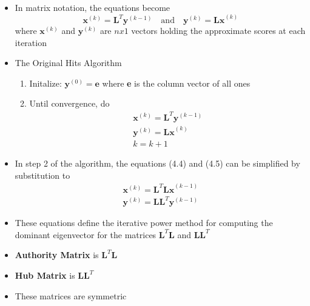 \documentclass[11pt]{report}
\begin{document}
\begin{itemize}
\begin{itemize}
\item In matrix notation, the equations become \begin{equation}
\textbf{x}^{(k)} = \textbf{L}^T\textbf{y}^{(k-1)}\quad\mathrm{and}\quad \textbf{y}^{(k)}=\textbf{Lx}^{(k)}
\end{equation} where \(\textbf{x}^{(k)}\) and \(\textbf{y}^{(k)}\) are \(\textit{n}x1\) vectors holding the approximate scores at each iteration
\item The Original Hits Algorithm
\begin{enumerate}
\item Initalize: \(\textbf{y}^{(0)}=\textbf{e} \) where \textbf{e} is the column vector of all ones
\item Until convergence, do \begin{eqnarray}
\textbf{x}^{(k)} =\textbf{L}^T\textbf{y}^{(k-1)}\\
\textbf{y}^{(k)} =\textbf{Lx}^{(k)}\\
k=k+1
\end{eqnarray}
\end{enumerate}
\item In step 2 of the algorithm, the equations (4.4) and (4.5) can be simplified by substitution to \begin{eqnarray}
\textbf{x}^{(k)} = \textbf{L}^T\textbf{Lx}^{(k-1)}\\ \textbf{y}^{(k)}=\textbf{LL}^T\textbf{y}^{(k-1)}
\end{eqnarray}
\item These equations define the iterative power method for computing the dominant eigenvector for the matrices $\textbf{L}^T\textbf{L}$ and $\textbf{LL}^T$
\item \textbf{Authority Matrix} is $\textbf{L}^T\textbf{L}$
\item \textbf{Hub Matrix} is $\textbf{LL}^T$
\item These matrices are symmetric
\end{itemize}
\end{itemize}
\end{document}
